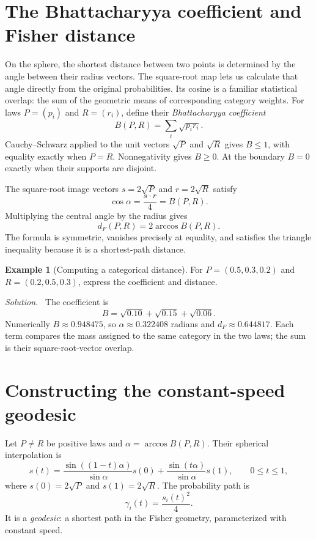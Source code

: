 \documentclass[11pt,oneside,openany]{book}
\theoremstyle{definition}
\newtheorem{example}{Example}[chapter]
\theoremstyle{remark}
\newenvironment{solution}{\par\smallskip\noindent\textit{Solution.}\ }{\par\smallskip}
\numberwithin{equation}{chapter}
\begin{document}
\section{The Bhattacharyya coefficient and Fisher distance}
On the sphere, the shortest distance between two points is determined by the angle between their radius vectors. The square-root map lets us calculate that angle directly from the original probabilities. Its cosine is a familiar statistical overlap: the sum of the geometric means of corresponding category weights.
For laws $P=(p_i)$ and $R=(r_i)$, define their \emph{Bhattacharyya coefficient}
\[
B(P,R)=\sum_i\sqrt{p_i r_i}.
\]
Cauchy--Schwarz applied to the unit vectors $\sqrt P$ and $\sqrt R$ gives $B\leq1$, with equality exactly when $P=R$. Nonnegativity gives $B\geq0$. At the boundary $B=0$ exactly when their supports are disjoint.

The square-root image vectors $s=2\sqrt P$ and $r=2\sqrt R$ satisfy
\[
\cos\alpha=\frac{s\cdot r}{4}=B(P,R).
\]
Multiplying the central angle by the radius gives
\begin{equation}\label{eq:sphericaldistance}
\boxed{d_F(P,R)=2\arccos B(P,R).}
\end{equation}
The formula is symmetric, vanishes precisely at equality, and satisfies the triangle inequality because it is a shortest-path distance.

\begin{example}[Computing a categorical distance]
For $P=(0.5,0.3,0.2)$ and $R=(0.2,0.5,0.3)$, express the coefficient and distance.
\begin{solution}
The coefficient is
\[
B=\sqrt{0.10}+\sqrt{0.15}+\sqrt{0.06}.
\]
Numerically $B\approx0.948475$, so $\alpha\approx0.322408$ radians and $d_F\approx0.644817$. Each term compares the mass assigned to the same category in the two laws; the sum is their square-root-vector overlap.
\end{solution}
\end{example}

\section{Constructing the constant-speed geodesic}
Let $P\ne R$ be positive laws and $\alpha=\arccos B(P,R)$. Their spherical interpolation is
\begin{equation}\label{eq:slerp}
s(t)=\frac{\sin((1-t)\alpha)}{\sin\alpha}s(0)
+\frac{\sin(t\alpha)}{\sin\alpha}s(1),\qquad 0\leq t\leq1,
\end{equation}
where $s(0)=2\sqrt P$ and $s(1)=2\sqrt R$. The probability path is
\begin{equation}\label{eq:sphericalpath}
\gamma_i(t)=\frac{s_i(t)^2}{4}.
\end{equation}
It is a \emph{geodesic}: a shortest path in the Fisher geometry, parameterized with constant speed.
\end{document}
